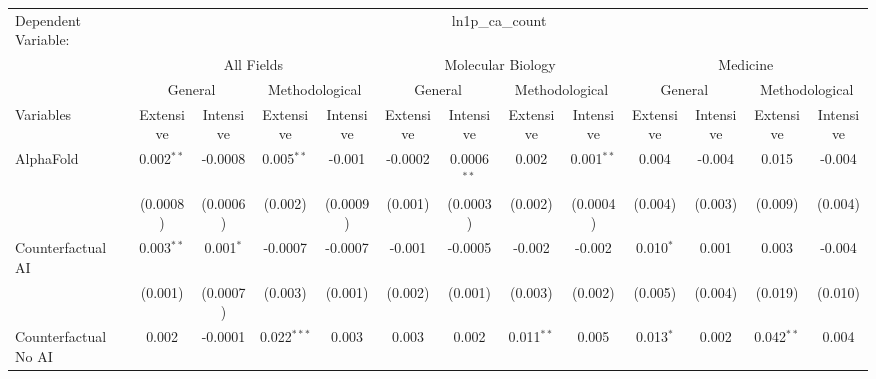\begingroup
\centering
\begin{tabular}{lcccccccccccc}
   \tabularnewline \midrule \midrule
   Dependent Variable: & \multicolumn{12}{c}{ln1p\_ca\_count}\\
 & \multicolumn{4}{c}{All Fields} & \multicolumn{4}{c}{Molecular Biology} & \multicolumn{4}{c}{Medicine} \\
\cmidrule(lr){2-5} \cmidrule(lr){6-9} \cmidrule(lr){10-13}
 & \multicolumn{2}{c}{General} & \multicolumn{2}{c}{Methodological} & \multicolumn{2}{c}{General} & \multicolumn{2}{c}{Methodological} & \multicolumn{2}{c}{General} & \multicolumn{2}{c}{Methodological} \\
\cmidrule(lr){2-3} \cmidrule(lr){4-5} \cmidrule(lr){6-7} \cmidrule(lr){8-9} \cmidrule(lr){10-11} \cmidrule(lr){12-13}
Variables & \multicolumn{1}{c}{Extensive} & \multicolumn{1}{c}{Intensive} & \multicolumn{1}{c}{Extensive} & \multicolumn{1}{c}{Intensive} & \multicolumn{1}{c}{Extensive} & \multicolumn{1}{c}{Intensive} & \multicolumn{1}{c}{Extensive} & \multicolumn{1}{c}{Intensive} & \multicolumn{1}{c}{Extensive} & \multicolumn{1}{c}{Intensive} & \multicolumn{1}{c}{Extensive} & \multicolumn{1}{c}{Intensive} \\
\cmidrule(lr){1-1}\cmidrule(lr){2-2} \cmidrule(lr){3-3} \cmidrule(lr){4-4} \cmidrule(lr){5-5} \cmidrule(lr){6-6} \cmidrule(lr){7-7} \cmidrule(lr){8-8} \cmidrule(lr){9-9} \cmidrule(lr){10-10} \cmidrule(lr){11-11} \cmidrule(lr){12-12} \cmidrule(lr){13-13}
   AlphaFold                                & 0.002$^{**}$ & -0.0008     & 0.005$^{**}$  & -0.001         & -0.0002     & 0.0006$^{**}$ & 0.002        & 0.001$^{**}$ & 0.004        & -0.004   & 0.015        & -0.004\\   
                                            & (0.0008)     & (0.0006)    & (0.002)       & (0.0009)       & (0.001)     & (0.0003)      & (0.002)      & (0.0004)     & (0.004)      & (0.003)  & (0.009)      & (0.004)\\   
   Counterfactual AI                        & 0.003$^{**}$ & 0.001$^{*}$ & -0.0007       & -0.0007        & -0.001      & -0.0005       & -0.002       & -0.002       & 0.010$^{*}$  & 0.001    & 0.003        & -0.004\\   
                                            & (0.001)      & (0.0007)    & (0.003)       & (0.001)        & (0.002)     & (0.001)       & (0.003)      & (0.002)      & (0.005)      & (0.004)  & (0.019)      & (0.010)\\   
   Counterfactual No AI                     & 0.002        & -0.0001     & 0.022$^{***}$ & 0.003          & 0.003       & 0.002         & 0.011$^{**}$ & 0.005        & 0.013$^{*}$  & 0.002    & 0.042$^{**}$ & 0.004\\   

\end{tabular}
